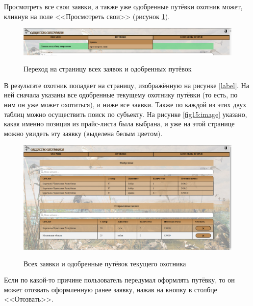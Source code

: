 	Просмотреть все свои заявки, а также уже одобренные путёвки охотник может, кликнув на поле <<Просмотреть свои>> (рисунок \ref{fig17:image}).
	
	\begin{figure}[h]
		\centering
		\begin{center}
			{\includegraphics[scale=0.34]{schemes/screens/to_have.png}}
			\caption{Переход на страницу всех заявок и одобренных путёвок}
			\label{fig17:image}
		\end{center}
	\end{figure}

	В результате охотник попадает на страницу, изображённую на рисунке \ref{label}. На ней сначала указаны все одобренные текущему охотнику путёвки (то есть, по ним он уже может охотиться), и ниже все заявки. Также по каждой из этих двух таблиц можно осуществить поиск по субъекту. На рисунке \ref{fig15:image} указано, какая именно позиция из прайс-листа была выбрана, и уже на этой странице можно увидеть эту заявку (выделена белым цветом).
	
	\begin{figure}[h]
		\centering
		\begin{center}
			{\includegraphics[scale=0.34]{schemes/screens/all_vouchers.png}}
			\caption{Всех заявки и одобренные путёвок текущего охотника}
			\label{fig18:image}
		\end{center}
	\end{figure}

	Если по какой-то причине пользователь передумал оформлять путёвку, то он может отозвать оформленную ранее заявку, нажав на кнопку в столбце <<Отозвать>>. 
	
